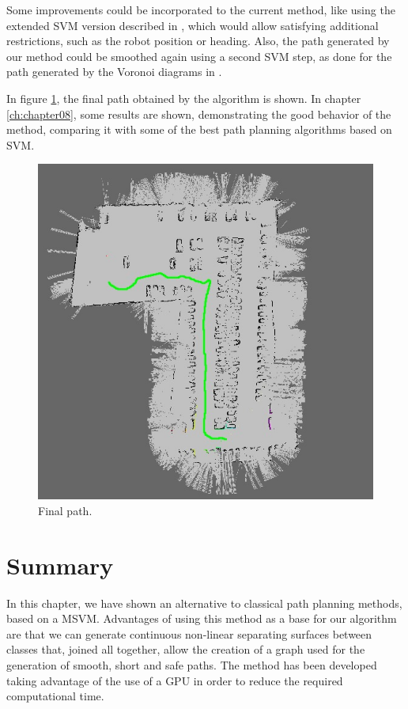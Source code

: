 Some improvements could be incorporated to the current method, like using the extended \ac{SVM} version described in \cite{qingyang2012local}, which would allow satisfying additional restrictions, such as the robot position or heading. Also, the path generated by our method could be smoothed again using a second \ac{SVM} step, as done for the path generated by the Voronoi diagrams in \cite{yang2012safe}.

In figure \ref{fig:cp06_final_path}, the final path obtained by the algorithm is shown. In chapter \ref{ch:chapter08}, some results are shown, demonstrating the good behavior of the method, comparing it with some of the best path planning algorithms based on \ac{SVM}.

\begin{figure}[h!]
  \centering
  \includegraphics[width=\textwidth, height=0.75\textwidth]{figure7}
  \caption{Final path.}
  \label{fig:cp06_final_path}
\end{figure}

\section{Summary}\label{ch:chapter06_03}

In this chapter, we have shown an alternative to classical path planning methods, based on a \acf{MSVM}. Advantages of using this method as a base for our algorithm are that we can generate continuous non-linear separating surfaces between classes that, joined all together, allow the creation of a graph used for the generation of smooth, short and safe paths. The method has been developed taking advantage of the use of a \ac{GPU} in order to reduce the required computational time.

